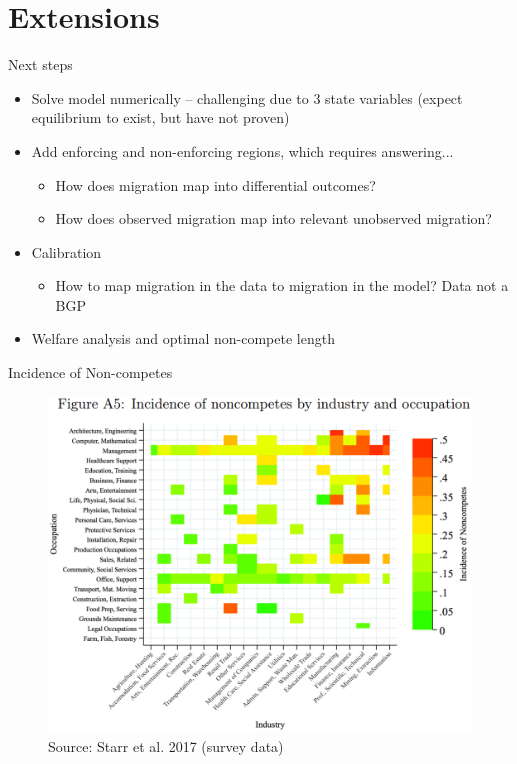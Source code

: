 \documentclass[english,usenames,dvipsnames]{beamer}
\begin{document}
\section{Extensions}
\begin{frame}{Next steps}
\begin{itemize}
	\item Solve model numerically -- challenging due to 3 state variables (expect equilibrium to exist, but have not proven)
	\item Add enforcing and non-enforcing regions, which requires answering...
	\begin{itemize}
		\item How does migration map into differential outcomes?
		\item How does observed migration map into relevant unobserved migration?
	\end{itemize}
	\item Calibration
	\begin{itemize}
		\item How to map migration in the data to migration in the model? Data not a BGP
	\end{itemize}
	\item Welfare analysis and optimal non-compete length
\end{itemize}
\end{frame}


\appendix

\captionsetup[figure]{labelformat=empty}

\begin{frame}{Incidence of Non-competes}
\label{incidence_ind_oc}
\hyperlink{Motivation1}{}
\begin{figure}
	\includegraphics[scale=0.38]{figures/nc_incidence_industry_and_occupation}
	\caption{Source: Starr et al. 2017 (survey data)}
\end{figure}
\end{frame}
\end{document}
